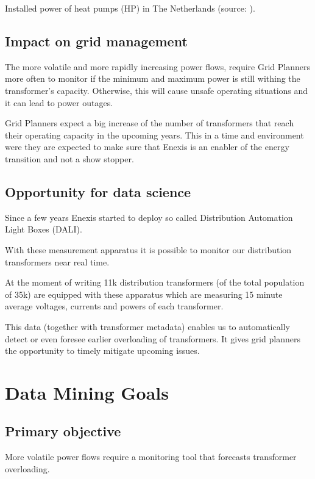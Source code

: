\documentclass[letterpaper,10pt,english]{sphinxmanual}
\begin{document}
Installed power of heat pumps (HP) in The Netherlands (source: ).


\subsection{Impact on grid management}
\label{\detokenize{business_understanding:impact-on-grid-management}}
The more volatile and more rapidly increasing power flows, require Grid Planners more often to monitor if the minimum and maximum power is still withing the transformer’s capacity.
Otherwise, this will cause unsafe operating situations and it can lead to power outages.

Grid Planners expect a big increase of the number of transformers that reach their operating capacity in the upcoming years.
This in a time and environment were they are expected to make sure that Enexis is an enabler of the energy transition and not a show stopper.


\subsection{Opportunity for data science}
\label{\detokenize{business_understanding:opportunity-for-data-science}}
Since a few years Enexis started to deploy so called Distribution Automation Light Boxes (DALI).

With these measurement apparatus it is possible to monitor our distribution transformers near real time.

At the moment of writing 11k distribution transformers (of the total population of 35k) are equipped with these apparatus which are measuring 15 minute average voltages, currents and powers of each transformer.

This data (together with transformer metadata) enables us to automatically detect or even foresee earlier overloading of transformers.
It gives grid planners the opportunity to timely mitigate upcoming issues.


\section{Data Mining Goals}
\label{\detokenize{business_understanding:data-mining-goals}}

\subsection{Primary objective}
\label{\detokenize{business_understanding:primary-objective}}
More volatile power flows require a monitoring tool that forecasts transformer overloading.
\end{document}
